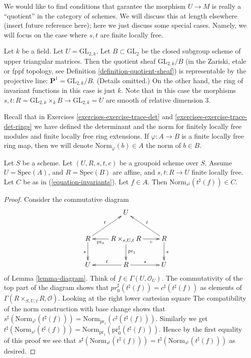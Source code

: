 \medskip\noindent
We would like to find conditions that garantee the morphism $U \to M$ is
really a ``quotient'' in the category of schemes. We will discuss this at
length elsewhere (insert future reference here); here we just discuss some
special cases. Namely, we will focus on the case where $s, t$ are finite
locally free.

\begin{example}
\label{example-quotient-projective-line}
Let $k$ be a field. Let $U = \text{GL}_{2, k}$. Let $B \subset \text{GL}_2$
be the closed subgroup scheme of upper triangular matrices. 
Then the quotient sheaf $\text{GL}_{2,k}/B$ (in the Zariski, etale or
fppf topology, see Definition \ref{definition-quotient-sheaf}) is
representable by the projective line: $\mathbf{P}^1 = \text{GL}_{2,k}/B$.
(Details omitted.)
On the other hand, the ring of invariant functions in this case is just $k$.
Note that in this case the morphisms
$s, t : R = \text{GL}_{2, k} \times_k B \to \text{GL}_{2, k} = U$ are smooth
of relative dimension $3$.
\end{example}

\noindent
Recall that in Exercises \ref{exercises-exercise-trace-det}
and \ref{exercises-exercise-trace-det-rings} we have defined the determinant
and the norm for finitely locally free modules and finite locally free ring
extensions. If $\varphi : A \to B$ is a finite locally free ring map, then
we will denote $\text{Norm}_\varphi(b) \in A$ the norm of $b \in B$.

\begin{lemma}
\label{lemma-determinant-trick}
Let $S$ be a scheme. Let $(U, R, s, t, c)$ be a groupoid scheme over $S$.
Assume $U = \text{Spec}(A)$, and $R = \text{Spec}(B)$ are affine, and
$s, t : R \to U$ finite locally free.
Let $C$ be as in (\ref{equation-invariants}).
Let $f \in A$. Then $\text{Norm}_{s^\sharp}(t^\sharp(f)) \in C$.
\end{lemma}

\begin{proof}
Consider the commutative diagram
$$
\xymatrix{
& U & \\
R \ar[d]_s \ar[ru]^t &
R \times_{s, U, t} R
\ar[l]^-{\text{pr}_0} \ar[d]^{\text{pr}_1} \ar[r]_-c &
R \ar[d]^s \ar[lu]_t \\
U & R \ar[l]_t \ar[r]^s & U
}
$$
of Lemma \ref{lemma-diagram}.
Think of $f \in \Gamma(U, \mathcal{O}_U)$. The commutativity of the
top part of the diagram shows that
$pr_0^\sharp(t^\sharp(f)) = c^\sharp(t^\sharp(f))$ as elements of
$\Gamma(R \times_{S, U, t} R, \mathcal{O})$.
Looking at the right lower cartesian square
The compatibility of the norm construction with base change shows that
$s^\sharp(\text{Norm}_{s^\sharp}(t^\sharp(f))) =
\text{Norm}_{\text{pr}_1}(c^\sharp(t^\sharp(f)))$.
Similarly we get
$t^\sharp(\text{Norm}_{s^\sharp}(t^\sharp(f))) =
\text{Norm}_{\text{pr}_1}(\text{pr}_0^\sharp(t^\sharp(f)))$.
Hence by the first equality of this proof we see that
$s^\sharp(\text{Norm}_{s^\sharp}(t^\sharp(f))) =
t^\sharp(\text{Norm}_{s^\sharp}(t^\sharp(f)))$ as desired.
\end{proof}

